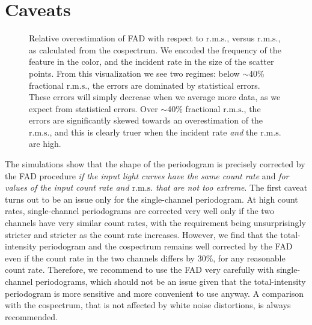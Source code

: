 \documentclass[twocolumn]{aastex61}
\newcommand{\rms}{\ensuremath{\mathrm{r.m.s.}}\xspace}
\begin{document}
\section{Caveats}\label{sec:caveat}
\begin{figure*}
    \caption{Relative overestimation of FAD with respect to \rms, versus \rms, as calculated from the cospectrum.  
    We encoded the frequency of the feature in the color, and the incident rate in the size of the scatter points.
    From this visualization we see two regimes: below $\sim$40\% fractional \rms, the errors are dominated by statistical errors. 
    These errors will simply decrease when we average more data, as we expect from statistical errors.
    Over $\sim$40\% fractional \rms, the errors are significantly skewed towards an overestimation of the \rms, and this is 
    clearly truer when the incident rate \textit{and} the \rms are high.}
    \label{fig:errors}
\end{figure*}
The simulations show that the shape of the periodogram is precisely corrected by the FAD procedure \textit{if the input light curves have the same count rate} and \textit{for values of the input count rate and \rms that are not too extreme}. 
The first caveat turns out to be an issue only for the single-channel periodogram. 
At high count rates, single-channel periodograms are corrected very well only if the two channels have very similar count rates, with the requirement being unsurprisingly stricter and stricter as the count rate increases.
However, we find that the total-intensity periodogram and the cospectrum remains well corrected by the FAD even if the count rate in the two channels differs by 30\%, for any reasonable count rate.
Therefore, we recommend to use the FAD very carefully with single-channel periodograms, which should not be an issue given that the total-intensity periodogram is more sensitive and more convenient to use anyway. 
A comparison with the cospectrum, that is not affected by white noise distortions, is always recommended. 
\end{document}
